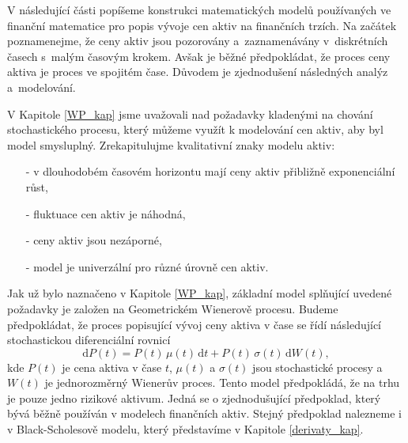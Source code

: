 \documentclass[a4paper,12pt]{report}
\theoremstyle{definition} \newtheorem{definice}[veta]{Definice}
\theoremstyle{remark}
\begin{document}
V následující části popíšeme konstrukci matematických modelů používaných ve finanční matematice pro popis vývoje cen aktiv na finančních trzích.
Na začátek poznamenejme, že ceny aktiv jsou pozorovány a~zaznamenávány v~diskrétních časech s~malým časovým krokem.
Avšak je běžné předpokládat, že proces ceny aktiva je proces ve spojitém čase.
Důvodem je zjednodušení následných analýz a~modelování.

V Kapitole \ref{WP_kap} jsme uvažovali nad požadavky kladenými na chování stochastického procesu, který můžeme využít k modelování cen aktiv, aby byl model smysluplný.
Zrekapitulujme kvalitativní znaky modelu aktiv:
\begin{itemize}
\item[-] v dlouhodobém časovém horizontu mají ceny aktiv přibližně exponenciální růst,
\item[-] fluktuace cen aktiv je náhodná,
\item[-] ceny aktiv jsou nezáporné,
\item[-] model je univerzální pro různé úrovně cen aktiv.
\end{itemize}
Jak už bylo naznačeno v Kapitole \ref{WP_kap}, základní model splňující uvedené požadavky je založen na Geometrickém Wienerově procesu. 
Budeme předpokládat, že proces popisující vývoj ceny aktiva v čase se řídí následující stochastickou diferenciální rovnicí %
\begin{equation}\label{risk_asset_model}
\mathrm{d}P(t)=P(t)\,\mu(t)\,\mathrm{d}t+P(t)\,\sigma(t)\,\mathrm{d}W(t),
\end{equation}
kde $P(t)$ je cena aktiva v čase $t$, $\mu(t)$ a $\sigma(t)$ jsou stochastické procesy a~$W(t)$  je jednorozměrný Wienerův proces.
Tento model předpokládá, že na trhu je pouze jedno rizikové aktivum. %
Jedná se o zjednodušující předpoklad, který bývá běžně používán v modelech finančních aktiv. 
Stejný předpoklad nalezneme i v Black-Scholesově modelu, který představíme v Kapitole \ref{derivaty_kap}.
\end{document}
